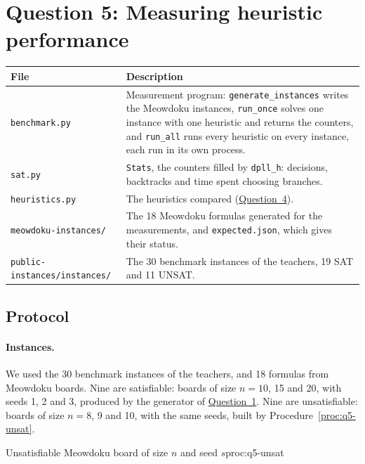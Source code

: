 \section{Question 5: Measuring heuristic performance}\label{sec:q5}

\begin{center}
\begin{tabular}{@{}p{6.2cm}p{10cm}@{}}
\toprule
File & Description\\
\midrule
\texttt{benchmark.py} & Measurement program: \texttt{generate\_instances} writes the Meowdoku instances, \texttt{run\_once} solves one instance with one heuristic and returns the counters, and \texttt{run\_all} runs every heuristic on every instance, each run in its own process.\\
\texttt{sat.py} & \texttt{Stats}, the counters filled by \texttt{dpll\_h}: decisions, backtracks and time spent choosing branches.\\
\texttt{heuristics.py} & The heuristics compared (\hyperref[sec:q4]{Question~4}).\\
\texttt{meowdoku-instances/} & The 18 Meowdoku formulas generated for the measurements, and \texttt{expected.json}, which gives their status.\\
\texttt{public-instances/instances/} & The 30 benchmark instances of the teachers, 19 SAT and 11 UNSAT.\\
\bottomrule
\end{tabular}
\end{center}

\subsection{Protocol}

\paragraph{Instances.} We used the 30 benchmark instances of the teachers, and 18 formulas from Meowdoku boards. Nine are satisfiable: boards of size $n=10$, 15 and 20, with seeds 1, 2 and 3, produced by the generator of \hyperref[sec:q1]{Question~1}. Nine are unsatisfiable: boards of size $n=8$, 9 and 10, with the same seeds, built by Procedure~\ref{proc:q5-unsat}.

\begin{pseudo}{Unsatisfiable Meowdoku board of size $n$ and seed $s$}{proc:q5-unsat}
\end{pseudo}

